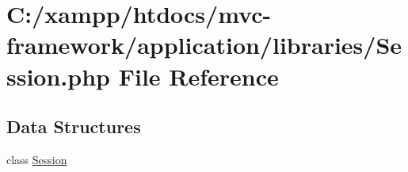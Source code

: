 \hypertarget{_session_8php}{}\section{C\+:/xampp/htdocs/mvc-\/framework/application/libraries/\+Session.php File Reference}
\label{_session_8php}
\subsection*{Data Structures}
\begin{DoxyCompactItemize}
\item 
class \hyperlink{class_session}{Session}
\end{DoxyCompactItemize}
